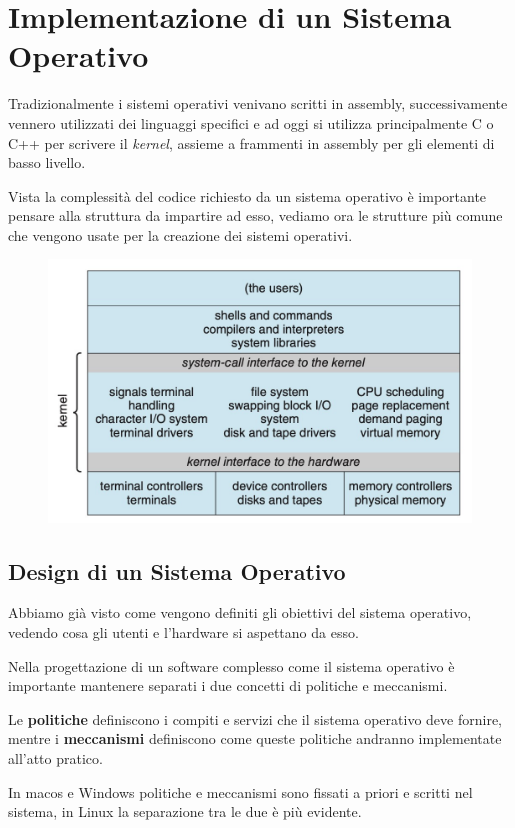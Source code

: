 \section{Implementazione di un Sistema Operativo}

Tradizionalmente i sistemi operativi venivano scritti in assembly, successivamente vennero utilizzati dei linguaggi specifici e ad oggi si utilizza principalmente C o C++ per scrivere il \textit{kernel}, assieme a frammenti in assembly per gli elementi di basso livello.

\spacer
Vista la complessità del codice richiesto da un sistema operativo è importante pensare alla struttura da impartire ad esso, vediamo ora le strutture più comune che vengono usate per la creazione dei sistemi operativi.

\begin{figure}[H]
    \centering
    \includegraphics[width=0.55\linewidth]{assets/os-structure.jpg}
\end{figure}

\subsection{Design di un Sistema Operativo}
Abbiamo già visto come vengono definiti gli obiettivi del sistema operativo, vedendo cosa gli utenti e l'hardware si aspettano da esso.

\spacer

Nella progettazione di un software complesso come il sistema operativo è importante mantenere separati i due concetti di politiche e meccanismi.

Le \textbf{politiche} definiscono i compiti e servizi che il sistema operativo deve fornire, mentre i \textbf{meccanismi} definiscono come queste politiche andranno implementate all'atto pratico.

\begin{note}
    In macos e Windows politiche e meccanismi sono fissati a priori e scritti nel sistema, in Linux la separazione tra le due è più evidente.
\end{note}

